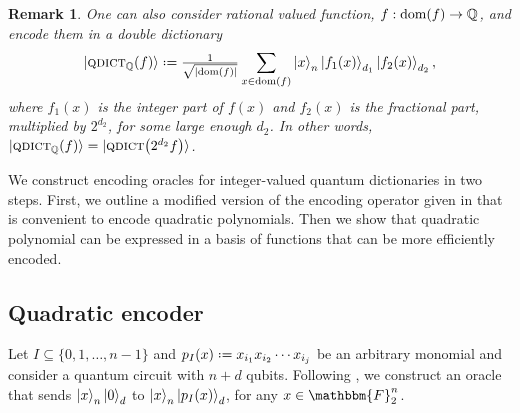 \documentclass[reqno, 12pt]{amsart}
\numberwithin{equation}{section}                %
\let\originalleft\left
\let\originalright\right
\renewcommand{\left}{\mathopen{}\mathclose\bgroup\originalleft}
\renewcommand{\right}{\aftergroup\egroup\originalright}
\def\({\mathopen{}\left(}
\def\){\right)\mathclose{}}
\newcommand*{\eqdef}{\mathrel{\vcenter{\baselineskip0.5ex \lineskiplimit0pt\hbox{.}\hbox{.}}}=}
\newtheorem{remark}[theorem]{Remark}
\def\F{\mathbbm{F}}
\def\Q{\mathbb{Q}}
\def\dom{\mathrm{dom}}
\def\qdict{\textsc{qdict}}
\begin{document}
\smallskip

\begin{remark}
    One can also consider rational valued function, $f : \dom \( f \) \rightarrow \Q$, and encode them in a double dictionary
    \begin{equation}
       \ket{\qdict_\Q \( f \)} \eqdef \tfrac{1}{\sqrt{\left| \dom \( f \) \right|}} \sum\limits_{x \in \dom \( f \)} \ket{x}_n \ket{f_1 (x)}_{d_1} \ket{f_2 (x)}_{d_2},
    \end{equation}
    where $f_1 (x)$ is the integer part of $f (x)$ and $f_2 (x)$ is the fractional part, multiplied by $2^{d_2}$, for some large enough $d_2$. In other words, $\ket{\qdict_\Q \( f \)} = \ket{\qdict \( 2^{d_2} f \)}$.
\end{remark}

\smallskip

We construct encoding oracles for integer-valued quantum dictionaries in two steps. First, we outline a modified version of the encoding operator given in \cite{gilliam_grover_2021} that is convenient to encode quadratic polynomials. Then we show that quadratic polynomial can be expressed in a basis of functions that can be more efficiently encoded.

\medskip

\subsection{Quadratic encoder}
\label{sec:encoder}

Let $I \subseteq \{ 0, 1, \ldots, n - 1 \}$ and $p_I (x) \eqdef x_{i_1} x_{i_2} \cdots x_{i_j}$ be an arbitrary monomial and consider a quantum circuit with $n + d$ qubits. Following \cite{gilliam_grover_2021}, we construct an oracle that sends $\ket{x}_n \ket{0}_d$ to $\ket{x}_n \ket{p_I (x)}_d$, for any $x \in \F_2^n$.
\end{document}

